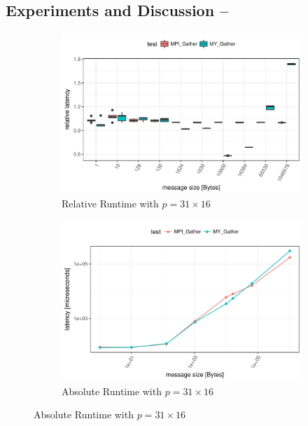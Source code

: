 \subsection{Experiments and Discussion -- \mygather}

\begin{figure}[H]
    \centering
    
    \begin{subfigure}[b]{0.49\textwidth}
        \includegraphics[width=\textwidth]{../benchmarks/openmpi/binom/gather_31/rel_runtime.pdf}
        \caption{Relative Runtime with $p=31 \times 16$}
        \label{fig:Gather:OpenMPI:Rel:31}
    \end{subfigure}
    \begin{subfigure}[b]{0.49\textwidth}
        \includegraphics[width=\textwidth]{../benchmarks/openmpi/binom/gather_31/runtime.pdf}
        \caption{Absolute Runtime with $p=31 \times 16$}
        \label{fig:Gather:OpenMPI:Abs:31}
    \end{subfigure}
    

\end{figure}
